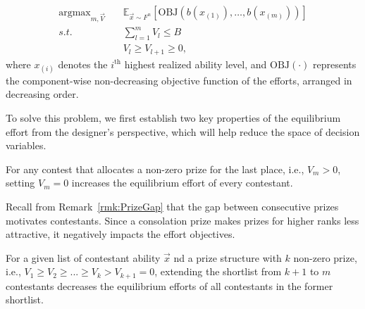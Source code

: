 \[
    \begin{aligned}
        \mathop{\arg \max}_{m,\vec{V}} \quad & \mathbb{E}_{\vec{x} \sim F^n} [ \text{OBJ}(b(x_{(1)}), \ldots,b(x_{(m)}))] \\
        s.t. \quad & \sum_{l=1}^{m} V_l \leq B \\
            & V_l  \geq V_{l+1} \geq 0,
    \end{aligned}
\]
where $x_{(i)}$ denotes the $i^\text{th}$ highest realized ability level, and $\text{OBJ}(\cdot)$ represents the component-wise non-decreasing objective function of the efforts, arranged in decreasing order. %

To solve this problem, we first establish two key properties of the equilibrium effort from the designer's perspective, which will help reduce the space of decision variables.


\begin{corollary}\label{coro:Consolation}
    For any contest that allocates a non-zero prize for the last place, i.e., \(V_m > 0\), setting \( V_m = 0\) increases the equilibrium effort of every contestant.
\end{corollary}

Recall from Remark~\ref{rmk:PrizeGap} that the gap between consecutive prizes motivates contestants. Since a consolation prize makes prizes for higher ranks less attractive, it negatively impacts the effort objectives.

\begin{corollary}\label{coro:EmptyPrize}
For a given list of contestant ability $\vec{x}$ nd a prize structure with $k$ non-zero prize, i.e., \( V_1 \geq V_2 \geq ... \geq V_k > V_{k+1} = 0 \), extending the shortlist from $k+1$ to $m$ contestants decreases the equilibrium efforts of all contestants in the former shortlist.
\end{corollary}

